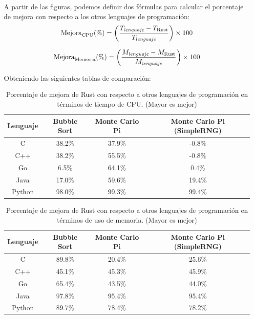 A partir de las figuras, podemos definir dos fórmulas para calcular el porcentaje de mejora con respecto a los otros lenguajes de programación:
\begin{equation}
    \text{Mejora}_{\text{CPU}} (\%) = \left( \frac{T_{\text{\textit{lenguaje}}} - T_{\text{Rust}}}{T_{\text{\textit{lenguaje}}}} \right) \times 100
\end{equation}

\begin{equation}
    \text{Mejora}_{\text{Memoria}} (\%) = \left( \frac{M_{\text{\textit{lenguaje}}} - M_{\text{Rust}}}{M_{\text{\textit{lenguaje}}}} \right) \times 100
\end{equation}


Obteniendo las siguientes tablas de comparación:

\begin{table}[H]
\centering
\begin{tabular}{|c|c|c|c|}
\hline
\textbf{Lenguaje} & \textbf{Bubble Sort} & \textbf{Monte Carlo Pi} & \textbf{Monte Carlo Pi (SimpleRNG)} \\
\hline
C      & 38.2\%  & 37.9\%  & -0.8\% \\
C++    & 38.2\%  & 55.5\%  & -0.8\% \\
Go     & 6.5\%   & 64.1\%  & 0.4\%           \\
Java   & 17.0\%  & 59.6\%  & 19.4\%          \\
Python & 98.0\%  & 99.3\%  & 99.4\%          \\
\hline
\end{tabular}
\caption{Porcentaje de mejora de Rust con respecto a otros lenguajes de programación en términos de tiempo de CPU. (Mayor es mejor)}
\end{table}

\begin{table}[H]
\centering
\begin{tabular}{|c|c|c|c|}
\hline
\textbf{Lenguaje} & \textbf{Bubble Sort} & \textbf{Monte Carlo Pi} & \textbf{Monte Carlo Pi (SimpleRNG)} \\
\hline
C      & 89.8\%  & 20.4\%  & 25.6\%  \\
C++    & 45.1\%  & 45.3\%  & 45.9\%  \\
Go     & 65.4\%  & 43.5\%  & 44.0\%  \\
Java   & 97.8\%  & 95.4\%  & 95.4\%  \\
Python & 89.7\%  & 78.4\%  & 78.2\%  \\
\hline
\end{tabular}
\caption{Porcentaje de mejora de Rust con respecto a otros lenguajes de programación en términos de uso de memoria. (Mayor es mejor)}
\end{table}

